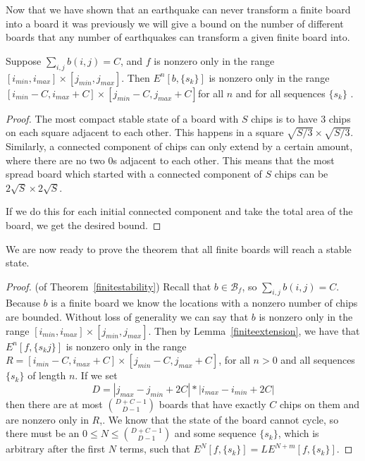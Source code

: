 \documentclass[runningheads,a4paper]{llncs}
\begin{document}
Now that we have shown that an earthquake can never transform a finite board into a board it was previously we will give a bound on the number of different boards that any number of earthquakes can transform a given finite board into.
\begin{lemma}
\label{finiteextension}
Suppose $\sum_{i,j} b(i,j) = C$, and $f$ is nonzero only in the range $[i_{min}, i_{max}] \times [j_{min}, j_{max}]$. Then   $E^n[b, \{s_k\}]$ is nonzero only in the range $[i_{min}-C, i_{max}+C] \times [j_{min}-C, j_{max}+C]$for all $n$ and for all sequences $\{s_k\}$ .
\end{lemma}

\begin{proof}
The most compact stable state of a board with $S$ chips is to have $3$ chips on each square adjacent to each other. This happens in a square $\sqrt{S/3} \times \sqrt{S/3}$. Similarly, a connected component of chips can only extend by a certain amount, where there are no two 0s adjacent to each other. This means that the most spread board which started with a connected component of $S$ chips can be $2\sqrt{S} \times 2\sqrt{S}$. 

If we do this for each initial connected component and take the total area of the board, we get the desired bound.
\end{proof}

We are now ready to prove the theorem that all finite boards will reach a stable state. 

\begin{proof}
(of Theorem~\ref{finitestability}) Recall that $b \in \mathcal{B}_f$, so $\sum_{i,j} b(i,j) = C$. Because $b$ is a finite board we know the locations with a nonzero number of chips are bounded.  Without loss of generality we can say that $b$ is nonzero only in the range $[i_{min}, i_{max}] \times [j_{min}, j_{max}]$. Then by Lemma~\ref{finiteextension}, we have that $E^n[f, \{s_kj \}]$ is nonzero only in the range $ R=[i_{min}-C, i_{max}+C] \times [j_{min}-C, j_{max}+C]$, for all $n>0$ and all sequences $\{ s_k \}$ of length $n$.
If we set 
\begin{equation*}
D= |j_{max}-j_{min} + 2C|*|i_{max} - i_{min} + 2C|
\end{equation*}
then there are at most  $\binom{D+C-1}{D-1}$  boards that have exactly $C$ chips on them and are nonzero only in $R$,. We know that the state of the board cannot cycle, so there must be an $0 \leq N \leq \binom{D+C-1}{D-1}$ and some sequence $\{s_k\}$, which is arbitrary after the first $N$ terms, such that $E^N[ f, \{s_k\}] = LE^{N+m}[f, \{s_k\}]$. 
\end{proof}
\end{document}
